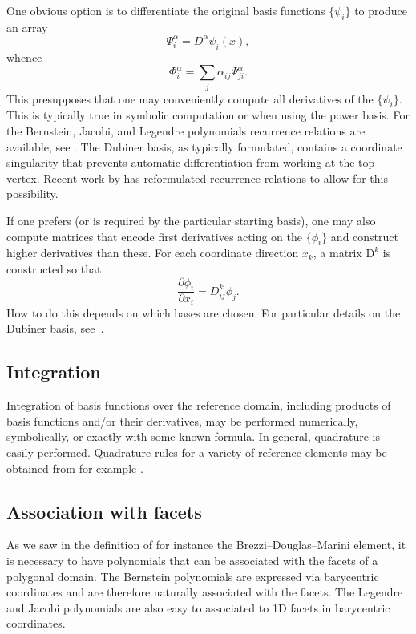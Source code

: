 One obvious option is to differentiate the
original basis functions $\{ \psi_i \}$ to produce an array
\begin{equation}
\Psi^\alpha_i = D^\alpha \psi_i(x),
\end{equation}
whence
\begin{equation}
\Phi^\alpha_i = \sum_j \alpha_{ij} \Psi^\alpha_{ji}.
\end{equation}
This presupposes that one may conveniently compute all derivatives of
the $\{ \psi_i \}$.  This is typically true in symbolic computation
or when using the power basis.  For the Bernstein, Jacobi,
and Legendre polynomials recurrence relations are available, see
\citet{KarniadakisSherwin2005,Kirby2010}.  The Dubiner basis, as
typically formulated, contains a coordinate singularity that prevents
automatic differentiation from working at the top vertex.  Recent work
by \citet{Kirby} has reformulated recurrence relations to allow for
this possibility.

If one prefers (or is required by the particular starting basis), one
may also compute matrices that encode first derivatives acting on the
$\{ \phi_i \}$ and construct higher derivatives than these.  For each
coordinate direction $x_k$, a matrix $\mathrm{D}^k$ is constructed so that
\begin{equation}
\frac{\partial \phi_i}{\partial x_i} =
D^k_{ij} \phi_j.
\end{equation}
How to do this depends on which bases are chosen.  For particular details
on the Dubiner basis, see~\citet{Dubiner1991}.


\subsection{Integration}

Integration of basis functions over the reference domain, including
products of basis functions and/or their derivatives, may be performed
numerically, symbolically, or exactly with some known formula.
In general, quadrature is easily performed.  Quadrature rules for
a variety of reference elements may be obtained from for example
\citep{Dunavant1985,KeeganRidzalBochev2008,SolinSegethDolevzel2004}.


\subsection{Association with facets}

As we saw in the definition of for instance the Brezzi--Douglas--Marini
element, it is necessary to have polynomials that can be associated with
the facets of a polygonal domain. The Bernstein polynomials are expressed
via barycentric coordinates and are therefore naturally associated
with the facets. The Legendre and Jacobi polynomials are also easy to
associated to 1D facets in barycentric coordinates.

